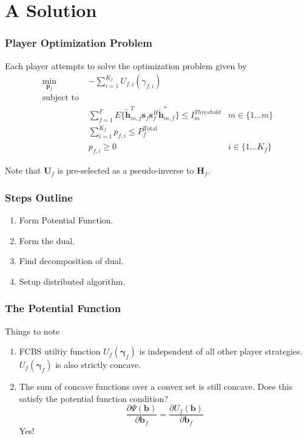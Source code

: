 \documentclass[10pt,tgadventor, onlymath]{beamer}
\begin{document}
\section{A Solution}
\begin{frame}
\frametitle{Player Optimization Problem}
Each player attempts to solve the optimization problem given by 
	\begin{subequations}
	\begin{align}
	    \underset{\mathbf{p}_{f} }{\text{min}} \;
	    & - \sum_{i=1}^{K_f}
    	U_{f,i}(\gamma_{f,i}) \label{player_opt_c} \\
	    \text{subject to  }\\
	  &
	  \sum^F_{f=1} E\{ \mathbf{\tilde{h}}_{m,f}^T  \mathbf{s}_{f} 						
	\mathbf{s}_{f}^{H} \mathbf{\tilde{h}}_{m,f}^* \}
	\leq I^{Threshold}		
	_{m} & m \in \{1 ...m\} 
		\label{interference_const_c}\\
        & 
        	\sum_{i=1}^{K_{f}} p_{f,i}
	   \leq P_{f}^{\text{Total}}  \label{power_const_c}\\
        & p_{f,i} \geq 0 &  i\in \{1 ...K_{f}\} \label{pos_power_const_c}
	\end{align}
	\end{subequations}

Note that $\mathbf{U}_{f}$ is pre-selected as a pseudo-inverse to  $\mathbf{H}_f$.
\end{frame}


\begin{frame}
\frametitle{Steps Outline}
\begin{enumerate}
\item
	Form Potential Function.
\item 
	Form the dual.
\item 
	Find decomposition of dual.
\item
	Setup distributed algorithm.
\end{enumerate}
\end{frame}

\begin{frame}
\frametitle{The Potential Function}
Things to note
\begin{enumerate}
\item
	FCBS utiltiy function $U_{f}(\boldsymbol{\gamma}_{f})$ is independent of all other player strategies. 
	$U_{f}(\boldsymbol{\gamma}_{f})$ is also strictly concave.
\item
	The sum of concave functions over a convex set is still concave. Does this satisfy the potential function 			condition?
	\begin{equation*}\label{potential_game_condition}
\frac{\partial \Psi(\mathbf{b})}{\partial \mathbf{b}_{f}}
 =
 \frac{\partial U_f(\mathbf{b})}{\partial \mathbf{b}_{f}}
\end{equation*} 
Yes!
\end{enumerate}

\end{frame}
\end{document}
